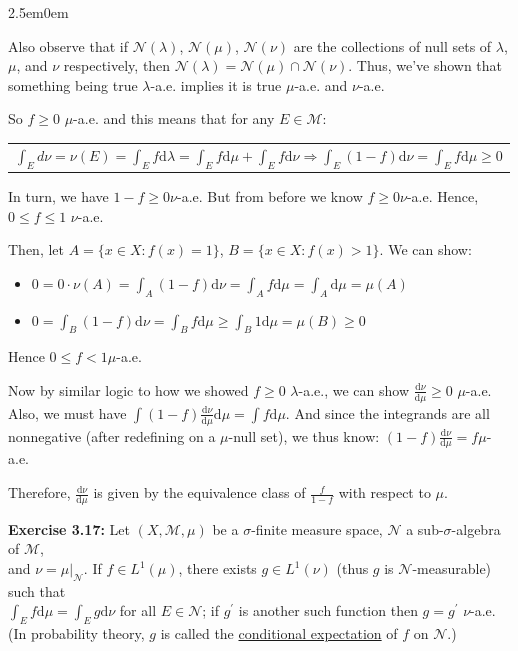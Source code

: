 \documentclass{book}
\newenvironment{myIndent}{%
   \begin{adjustwidth}{2.5em}{0em}%
}{%
   \end{adjustwidth}%
}
\newcommand{\udefine}[1]{{%
   \setulcolor{Red}%
   \setul{0.14em}{0.07em}%
   \ul{#1}%
}}
\newcommand{\blab}[1]{\textbf{#1}}
\newcommand{\df}{\mathrm{d}}
\newcommand{\retTwo}{\hfill\bigbreak}
\begin{document}
\begin{myIndent}
	Also observe that if $\mathcal{N}(\lambda)$, $\mathcal{N}(\mu)$, $\mathcal{N}(\nu)$ are the collections of null sets of $\lambda$, $\mu$, and $\nu$ respectively, then $\mathcal{N}(\lambda) = \mathcal{N}(\mu) \cap \mathcal{N}(\nu)$. Thus, we've shown that something being true $\lambda$-a.e. implies it is true $\mu$-a.e. and $\nu$-a.e.\retTwo

	So $f \geq 0$ $\mu$-a.e. and this means that for any $E \in \mathcal{M}$:

	{\centering\begin{tabular}{l}
		$\int_E d\nu = \nu(E) = \int_E f\df\lambda = \int_E f \df\mu + \int_E f \df\nu \Longrightarrow \int_E(1 - f)\df\nu = \int_E f \df\mu \geq 0$
	\end{tabular}\retTwo\par}

	In turn, we have $1 - f \geq 0$\phantom{..}$\nu$-a.e. But from before we know $f \geq 0$\phantom{..}$\nu$-a.e. Hence, $0 \leq f \leq 1$ $\nu$-a.e.\retTwo

	Then, let $A = \{x \in X : f(x) = 1\}$, $B = \{x \in X : f(x) > 1\}$. We can show:
	\begin{itemize}
		\item $0 = 0 \cdot \nu(A) = \int_A(1 - f)\df\nu = \int_A f\df \mu = \int_A \df\mu = \mu(A)$
		\item $0 = \int_B (1-f)\df\nu = \int_B f \df \mu \geq \int_B 1\df\mu = \mu(B) \geq 0$\\
	\end{itemize}

	Hence $0 \leq f < 1$\phantom{..}$\mu$-a.e.\retTwo

	Now by similar logic to how we showed $f \geq 0$ $\lambda$-a.e., we can show $\frac{\df \nu}{\df \mu} \geq 0$ $\mu$-a.e. Also, we must have $\int (1 - f)\frac{\df \nu}{\df \mu}\df \mu = \int f \df \mu$. And since the integrands are all nonnegative (after redefining on a $\mu$-null set), we thus know: $(1 - f)\frac{\df \nu}{\df \mu} = f$\phantom{..}$\mu$-a.e.\retTwo

	Therefore, $\frac{\df \nu}{\df \mu}$ is given by the equivalence class of $\frac{f}{1 - f}$ with respect to $\mu$.\retTwo
\end{myIndent}

\blab{Exercise 3.17:} Let $(X, \mathcal{M}, \mu)$ be a $\sigma$-finite measure space, $\mathcal{N}$ a sub-$\sigma$-algebra of $\mathcal{M}$,\\ and $\nu = \mu|_{\mathcal{N}}$. If $f \in L^1(\mu)$, there exists $g \in L^1(\nu)$ (thus $g$ is $\mathcal{N}$-measurable) such that\\ $\int_E f\df\mu = \int_E g \df\nu$ for all $E \in \mathcal{N}$; if $g^\prime$ is another such function then $g = g^\prime$ $\nu$-a.e.\\ (In probability theory, $g$ is called the \udefine{conditional expectation} of $f$ on $\mathcal{N}$.)\\ [-8pt]
\end{document}
